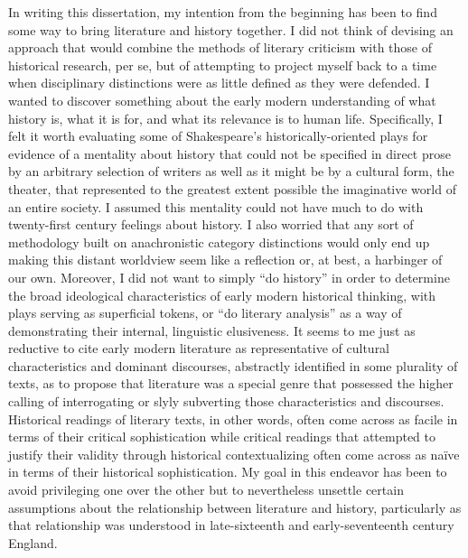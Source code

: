 In writing this dissertation, my intention from the beginning has been to find some way to bring literature and history together. I did not think of devising an approach that would combine the methods of literary criticism with those of historical research, per se, but of attempting to project myself back to a time when disciplinary distinctions were as little defined as they were defended. I wanted to discover something about the early modern understanding of what history is, what it is for, and what its relevance is to human life. Specifically, I felt it worth evaluating some of Shakespeare's historically-oriented plays for evidence of a mentality about history that could not be specified in direct prose by an arbitrary selection of writers as well as it might be by a cultural form, the theater, that represented to the greatest extent possible the imaginative world of an entire society. I assumed this mentality could not have much to do with twenty-first century feelings about history. I also worried that any sort of methodology built on anachronistic category distinctions would only end up making this distant worldview seem like a reflection or, at best, a harbinger of our own. Moreover, I did not want to simply ``do history'' in order to determine the broad ideological characteristics of early modern historical thinking, with plays serving as superficial tokens, or ``do literary analysis'' as a way of demonstrating their internal, linguistic elusiveness. It seems to me just as reductive to cite early modern literature as representative of cultural characteristics and dominant discourses, abstractly identified in some plurality of texts, as to propose that literature was a special genre that possessed the higher calling of interrogating or slyly subverting those characteristics and discourses. Historical readings of literary texts, in other words, often come across as facile in terms of their critical sophistication while critical readings that attempted to justify their validity through historical contextualizing often come across as naïve in terms of their historical sophistication. My goal in this endeavor has been to avoid privileging one over the other but to nevertheless unsettle certain assumptions about the relationship between literature and history, particularly as that relationship was understood in late-sixteenth and early-seventeenth century England.

